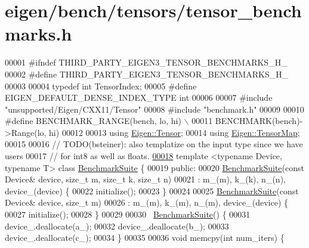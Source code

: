 \hypertarget{eigen_2bench_2tensors_2tensor__benchmarks_8h_source}{}\section{eigen/bench/tensors/tensor\+\_\+benchmarks.h}
\label{eigen_2bench_2tensors_2tensor__benchmarks_8h_source}

\begin{DoxyCode}
00001 \textcolor{preprocessor}{#ifndef THIRD\_PARTY\_EIGEN3\_TENSOR\_BENCHMARKS\_H\_}
00002 \textcolor{preprocessor}{#define THIRD\_PARTY\_EIGEN3\_TENSOR\_BENCHMARKS\_H\_}
00003 
00004 \textcolor{keyword}{typedef} \textcolor{keywordtype}{int} TensorIndex;
00005 \textcolor{preprocessor}{#define EIGEN\_DEFAULT\_DENSE\_INDEX\_TYPE int}
00006 
00007 \textcolor{preprocessor}{#include "unsupported/Eigen/CXX11/Tensor"}
00008 \textcolor{preprocessor}{#include "benchmark.h"}
00009 
00010 \textcolor{preprocessor}{#define BENCHMARK\_RANGE(bench, lo, hi) \(\backslash\)}
00011 \textcolor{preprocessor}{  BENCHMARK(bench)->Range(lo, hi)}
00012 
00013 \textcolor{keyword}{using} \hyperlink{class_eigen_1_1_tensor}{Eigen::Tensor};
00014 \textcolor{keyword}{using} \hyperlink{class_eigen_1_1_tensor_map}{Eigen::TensorMap};
00015 
00016 \textcolor{comment}{// TODO(bsteiner): also templatize on the input type since we have users}
00017 \textcolor{comment}{// for int8 as well as floats.}
\hyperlink{class_benchmark_suite}{00018} \textcolor{keyword}{template} <\textcolor{keyword}{typename} Device, \textcolor{keyword}{typename} T> \textcolor{keyword}{class }\hyperlink{class_benchmark_suite}{BenchmarkSuite} \{
00019  \textcolor{keyword}{public}:
00020   \hyperlink{class_benchmark_suite}{BenchmarkSuite}(\textcolor{keyword}{const} Device& device, \textcolor{keywordtype}{size\_t} m, \textcolor{keywordtype}{size\_t} k, \textcolor{keywordtype}{size\_t} n)
00021       : m\_(m), k\_(k), n\_(n), device\_(device) \{
00022     initialize();
00023   \}
00024 
00025   \hyperlink{class_benchmark_suite}{BenchmarkSuite}(\textcolor{keyword}{const} Device& device, \textcolor{keywordtype}{size\_t} m)
00026       : m\_(m), k\_(m), n\_(m), device\_(device) \{
00027     initialize();
00028   \}
00029 
00030   ~\hyperlink{class_benchmark_suite}{BenchmarkSuite}() \{
00031     device\_.deallocate(a\_);
00032     device\_.deallocate(b\_);
00033     device\_.deallocate(c\_);
00034   \}
00035 
00036   \textcolor{keywordtype}{void} memcpy(\textcolor{keywordtype}{int} num\_iters) \{

\end{DoxyCode}
